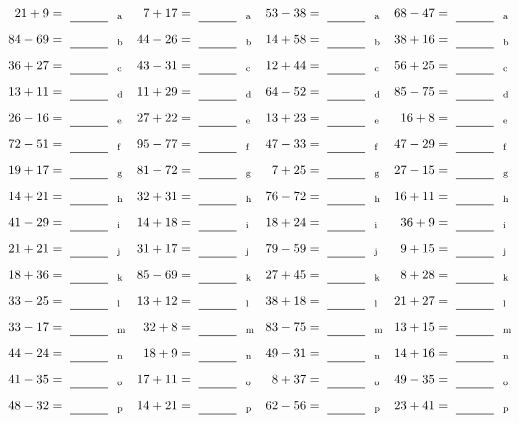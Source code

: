 \documentclass
[
  draft    = true,
  fontsize = 11pt,
  parskip  = half-
]
{scrartcl}
\begin{document}
\clearpage
\begin{align*}
    \pline{21+9}&=\rline{a}
  & \pline{7+17}&=\rline{a}
  & \pline{53-38}&=\rline{a}
  & \pline{68-47}&=\rline{a} \\[1ex]
    \pline{84-69}&=\rline{b}
  & \pline{44-26}&=\rline{b}
  & \pline{14+58}&=\rline{b}
  & \pline{38+16}&=\rline{b} \\[1ex]
    \pline{36+27}&=\rline{c}
  & \pline{43-31}&=\rline{c}
  & \pline{12+44}&=\rline{c}
  & \pline{56+25}&=\rline{c} \\[1ex]
    \pline{13+11}&=\rline{d}
  & \pline{11+29}&=\rline{d}
  & \pline{64-52}&=\rline{d}
  & \pline{85-75}&=\rline{d} \\[1ex]
    \pline{26-16}&=\rline{e}
  & \pline{27+22}&=\rline{e}
  & \pline{13+23}&=\rline{e}
  & \pline{16+8}&=\rline{e} \\[1ex]
    \pline{72-51}&=\rline{f}
  & \pline{95-77}&=\rline{f}
  & \pline{47-33}&=\rline{f}
  & \pline{47-29}&=\rline{f} \\[1ex]
    \pline{19+17}&=\rline{g}
  & \pline{81-72}&=\rline{g}
  & \pline{7+25}&=\rline{g}
  & \pline{27-15}&=\rline{g} \\[1ex]
    \pline{14+21}&=\rline{h}
  & \pline{32+31}&=\rline{h}
  & \pline{76-72}&=\rline{h}
  & \pline{16+11}&=\rline{h} \\[1ex]
    \pline{41-29}&=\rline{i}
  & \pline{14+18}&=\rline{i}
  & \pline{18+24}&=\rline{i}
  & \pline{36+9}&=\rline{i} \\[1ex]
    \pline{21+21}&=\rline{j}
  & \pline{31+17}&=\rline{j}
  & \pline{79-59}&=\rline{j}
  & \pline{9+15}&=\rline{j} \\[1ex]
    \pline{18+36}&=\rline{k}
  & \pline{85-69}&=\rline{k}
  & \pline{27+45}&=\rline{k}
  & \pline{8+28}&=\rline{k} \\[1ex]
    \pline{33-25}&=\rline{l}
  & \pline{13+12}&=\rline{l}
  & \pline{38+18}&=\rline{l}
  & \pline{21+27}&=\rline{l} \\[1ex]
    \pline{33-17}&=\rline{m}
  & \pline{32+8}&=\rline{m}
  & \pline{83-75}&=\rline{m}
  & \pline{13+15}&=\rline{m} \\[1ex]
    \pline{44-24}&=\rline{n}
  & \pline{18+9}&=\rline{n}
  & \pline{49-31}&=\rline{n}
  & \pline{14+16}&=\rline{n} \\[1ex]
    \pline{41-35}&=\rline{o}
  & \pline{17+11}&=\rline{o}
  & \pline{8+37}&=\rline{o}
  & \pline{49-35}&=\rline{o} \\[1ex]
    \pline{48-32}&=\rline{p}
  & \pline{14+21}&=\rline{p}
  & \pline{62-56}&=\rline{p}
  & \pline{23+41}&=\rline{p}
\end{align*}
\end{document}
